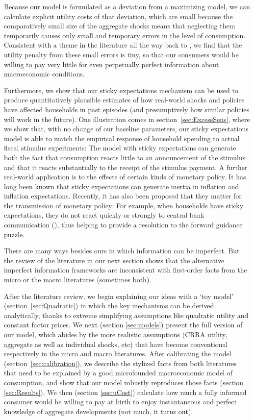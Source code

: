 Because our model is formulated as a deviation from a maximizing model, we can calculate explicit utility costs of that deviation, which are small because the comparatively small size of the aggregate shocks means that neglecting them temporarily causes only small and temporary errors in the level of consumption.  Consistent with a theme in the literature all the way back to \cite{ayNearRational}, we find that the utility penalty from these small errors is tiny, so that our consumers would be willing to pay very little for even perpetually perfect information about macroeconomic conditions.
\hypertarget{Matches-Stimulus}{} %


Furthermore, we show that our sticky expectations mechanism can be used to produce quantitatively plausible estimates of how real-world shocks and policies have affected households in past episodes (and presumptively how similar policies will work in the future).  One illustration comes in section~\ref{sec:ExcessSens}, where we show that, with no change of our baseline parameters, our sticky expectations model is able to match the empirical response of household spending to actual fiscal stimulus experiments: The model with sticky expectations can generate both the fact that consumption reacts little to an announcement of the stimulus and that it reacts substantially to the receipt of the stimulus payment.  A further real-world application is to the effects of certain kinds of monetary policy. It has long been known that sticky expectations can generate inertia in inflation and inflation expectations. Recently, it has also been proposed that they matter for the transmission of monetary policy: For example, when households have sticky expectations, they do not react quickly or strongly to central bank communication (\cite{arsInvestmentInattention}), thus helping to provide a resolution to the forward guidance puzzle.

There are many ways besides ours in which information can be imperfect.  But the review of the literature in our next section shows that the alternative imperfect information frameworks are inconsistent with first-order facts from the micro or the macro literatures (sometimes both).

After the literature review, we begin explaining our ideas with a `toy model' (section~\ref{sec:Quadratic}) in which the key mechanisms can be derived analytically, thanks to extreme simplifying assumptions like quadratic utility and constant factor prices.  We next (section \ref{sec:models}) present the full version of our model, which abides by the more realistic assumptions (CRRA utility, aggregate as well as individual shocks, etc) that have become conventional respectively in the micro and macro literatures. After calibrating the model (section~\ref{sec:calibration}), we describe the stylized facts from both literatures that need to be explained by a good microfounded macroeconomic model of consumption, and show that our model robustly reproduces those facts (section \ref{sec:Results}).
We then (section \ref{sec:uCost}) calculate how much a fully informed consumer would be willing to pay at birth to enjoy instantaneous and perfect knowledge of aggregate developments (not much, it turns out).

